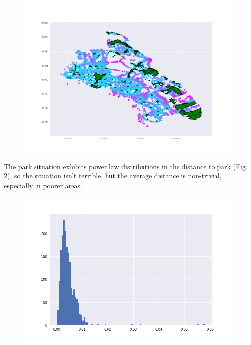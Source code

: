 \documentclass[]{report}
\begin{document}
	 \begin{figure}[H]
	 	\centering
	 	\includegraphics[width=\linewidth]{"img/distance to park"}
	 	\caption{}
	 	\label{fig:distance-to-park}
	 \end{figure}
	 
	 The park situation exhibits power law distributions in the distance to park (Fig. \ref{fig:park-distance-histogram}), so the situation isn't terrible, but the average distance is non-trivial, especially in poorer areas. 
	
	\begin{figure}[H]
		\centering
		\includegraphics[width=\linewidth]{"img/park distance histogram"}
		\caption{}
		\label{fig:park-distance-histogram}
	\end{figure}
	
	
	
\end{document}
